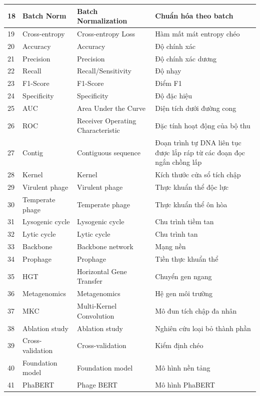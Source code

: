 \begin{longtable}{|m{0.6cm}|m{3cm}|m{5.5cm}|m{5.5cm}|}
18 & Batch Norm & Batch Normalization & Chuẩn hóa theo batch \\    \hline
19 & Cross-entropy & Cross-entropy Loss & Hàm mất mát entropy chéo \\    \hline
20 & Accuracy & Accuracy & Độ chính xác \\    \hline
21 & Precision & Precision & Độ chính xác dương \\    \hline
22 & Recall & Recall/Sensitivity & Độ nhạy \\    \hline
23 & F1-Score & F1-Score & Điểm F1 \\    \hline
24 & Specificity & Specificity & Độ đặc hiệu \\    \hline
25 & AUC & Area Under the Curve & Diện tích dưới đường cong \\    \hline
26 & ROC & Receiver Operating Characteristic & Đặc tính hoạt động của bộ thu \\    \hline
27 & Contig & Contiguous sequence & Đoạn trình tự DNA liên tục được lắp ráp từ các đoạn đọc ngắn chồng lấp \\    \hline
28 & Kernel & Kernel & Kích thước cửa sổ tích chập \\    \hline
29 & Virulent phage & Virulent phage & Thực khuẩn thể độc lực \\    \hline
30 & Temperate phage & Temperate phage & Thực khuẩn thể ôn hòa \\    \hline
31 & Lysogenic cycle & Lysogenic cycle & Chu trình tiềm tan \\    \hline
32 & Lytic cycle & Lytic cycle & Chu trình tan \\    \hline
33 & Backbone & Backbone network & Mạng nền \\    \hline
34 & Prophage & Prophage & Tiền thực khuẩn thể \\    \hline
35 & HGT & Horizontal Gene Transfer & Chuyển gen ngang \\    \hline
36 & Metagenomics & Metagenomics & Hệ gen môi trường \\    \hline
37 & MKC & Multi-Kernel Convolution & Mô đun tích chập đa nhân \\    \hline
38 & Ablation study & Ablation study & Nghiên cứu loại bỏ thành phần \\    \hline
39 & Cross-validation & Cross-validation & Kiểm định chéo \\    \hline
40 & Foundation model & Foundation model & Mô hình nền tảng \\    \hline
41 & PhaBERT & Phage BERT & Mô hình PhaBERT \\    \hline

\end{longtable}
